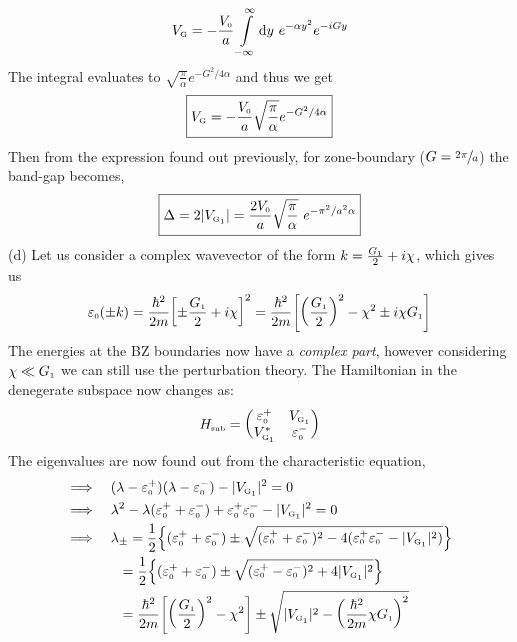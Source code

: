 \documentclass[usenames, svgnames, dvipsnames]{scrartcl}
\newcommand{\tund}[1]{_{\text{\tiny #1}}}
\begin{document}
$$V\tund{G}=-\frac{V\tund{0}}{a}\int\limits_{-\infty}^{\infty} \dd y \ e^{-\alpha y^2} e^{-iGy}$$
The integral evaluates to $\sqrt{\frac{\pi}{\alpha}}e^{-G^2/4\alpha}$ and thus we get 
$$\boxed{V\tund{G}= -\frac{V\tund{0}}{a}\sqrt{\frac{\pi}{\alpha}}e^{-G^2/4\alpha}}$$
Then from the expression found out previously, for zone-boundary ($G=\sfrac{2\pi}{a}$) the band-gap becomes,
$$\boxed{\Delta = 2|V\tund{G\textsubscript{1}}| = \frac{2V\tund{0}}{a}\sqrt{\frac{\pi}{\alpha}}\ e^{-\pi^2/a^2\alpha}}$$
(d) Let us consider a complex wavevector of the form $k = \frac{G\tund{1}}{2}+i\chi$, which gives us 
$$\varepsilon\tund{0}(\pm k) = \frac{\hbar^2}{2m}\qty[\pm \frac{G\tund{1}}{2}+i\chi]^2 = \frac{\hbar^2}{2m} \qty[\qty(\frac{G\tund{1}}{2})^2 -\chi^2 \pm i\chi G\tund{1}]$$
The energies at the BZ boundaries now have a \textit{complex part}, however considering $\chi\ll G\tund{1}$ we can still use the perturbation theory. The Hamiltonian in the denegerate subspace now changes as: 
$$H\tund{sub} = \mqty(\varepsilon^{+}\tund{0} & V\tund{G\textsubscript{1}} \\ V\tund{G\textsubscript{1}}^* & \varepsilon\tund{0}^{-})$$
The eigenvalues are now found out from the characteristic equation, 
\begin{align*}
    \implies\quad &(\lambda -\varepsilon^{+}\tund{0})(\lambda -\varepsilon^{-}\tund{0}) - |V\tund{G\textsubscript{1}}|^2 =0\\
    \implies \quad & \lambda^2 - \lambda(\varepsilon^{+}\tund{0} + \varepsilon^{-}\tund{0}) +\varepsilon^{+}\tund{0}\varepsilon^{-}\tund{0} - |V\tund{G\textsubscript{1}}|^2=0\\
    \implies \quad & \lambda_{\pm} = \frac{1}{2}\qty{(\varepsilon^{+}\tund{0} + \varepsilon^{-}\tund{0}) \pm \sqrt{(\varepsilon^{+}\tund{0} + \varepsilon^{-}\tund{0})^2 - 4(\varepsilon^{+}\tund{0}\varepsilon^{-}\tund{0} - |V\tund{G\textsubscript{1}}|^2)}}\\
    &\hspace{0.2cm} = \frac{1}{2}\qty{(\varepsilon^{+}\tund{0} + \varepsilon^{-}\tund{0}) \pm \sqrt{(\varepsilon^{+}\tund{0} - \varepsilon^{-}\tund{0})^2 +4|V\tund{G\textsubscript{1}}|^2}}\\
    &\hspace{0.2cm} = \frac{\hbar^2}{2m}\qty[\qty(\frac{G\tund{1}}{2})^2 - \chi^2] \pm \sqrt{|V\tund{G\textsubscript{1}}|^2 - \qty(\frac{\hbar^2}{2m}\chi G\tund{1})^2}
\end{align*}
\end{document}
